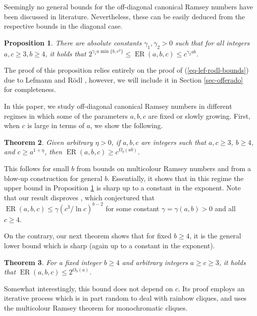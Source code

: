 \documentclass[10pt,a4paper]{article}
\theoremstyle{plain}
\newtheorem{theorem}{Theorem}[section]
\newtheorem{proposition}[theorem]{Proposition}
\theoremstyle{definition}
\newcommand{\offerado}[3]{\operatorname{ER}(#1,#2,#3)}
\begin{document}
Seemingly no general bounds for the off-diagonal canonical Ramsey numbers have been discussed in literature. Nevertheless, these can be easily deduced from the respective bounds in the diagonal case.

\begin{proposition}\label{prop-offerado-general}
There are absolute constants $\gamma_1,\gamma_2>0$ such that for all integers $a,c\ge 3, b\ge 4$, it holds that $2^{\gamma_1a\min\{b,c^2\}}\le \offerado{a}{b}{c}\le c^{\gamma_2 ab}$.
\end{proposition}

The proof of this proposition relies entirely on the proof of (\ref{eq-lef-rodl-bounds}) due to Lefmann and R\"odl \cite{lefmann1995erdHos}, however, we will include it in Section \ref{sec-offerado} for completeness.

In this paper, we study off-diagonal canonical Ramsey numbers in different regimes in which some of the parameters $a,b,c$ are fixed or slowly growing. First, when $c$ is large in terms of $a$, we show the following.

\begin{theorem}\label{thm-offerado-large-c}
    Given arbitrary $\eta>0$, if $a,b,c$ are integers such that $a,c\ge 3$, $b\ge 4$, and $c\ge a^{1+\eta}$, then $\offerado{a}{b}{c}\ge c^{\Omega_{\eta}(ab)}$.
\end{theorem}

This follows for small $b$ from bounds on multicolour Ramsey numbers and from a blow-up construction for general $b$. Essentially, it shows that in this regime the upper bound in Proposition \ref{prop-offerado-general} is sharp up to a constant in the exponent. Note that our result disproves \cite[Conjecture 19]{araujo2024off}, which conjectured that $\offerado{a}{b}{c}\le \gamma(c^3/\ln c)^{b-2}$ for some constant $\gamma=\gamma(a,b)>0$ and all $c\ge 4$.

On the contrary, our next theorem shows that for fixed $b\geq 4$, it is the general lower bound which is sharp (again up to a constant in the exponent).

\begin{theorem}\label{thm-offerado-fixed-b}
    For a fixed integer $b\geq 4$ and arbitrary integers $a\ge c\ge 3$, it holds that $\offerado{a}{b}{c}\le 2^{O_b(a)}$.
\end{theorem}

Somewhat interestingly, this bound does not depend on $c$. Its proof employs an iterative process which is in part random to deal with rainbow cliques, and uses the multicolour Ramsey theorem for monochromatic cliques.
\end{document}
